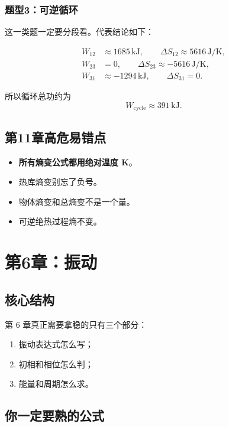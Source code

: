 \documentclass[12pt,a4paper]{article}
\newcommand{\warn}[1]{\textcolor{red!70!black}{\textbf{#1}}}
\begin{document}
\subsubsection*{题型3：可逆循环}

这一类题一定要分段看。代表结论如下：

\begin{align*}
W_{12} &\approx 1685\,\mathrm{kJ},\qquad \Delta S_{12}\approx 5616\,\mathrm{J/K},\\
W_{23} &= 0,\qquad \Delta S_{23}\approx -5616\,\mathrm{J/K},\\
W_{31} &\approx -1294\,\mathrm{kJ},\qquad \Delta S_{31}=0.
\end{align*}

所以循环总功约为
\[
W_{\text{cycle}}\approx 391\,\mathrm{kJ}.
\]

\subsection{第11章高危易错点}

\begin{itemize}
  \item \warn{所有熵变公式都用绝对温度 K}。
  \item 热库熵变别忘了负号。
  \item 物体熵变和总熵变不是一个量。
  \item 可逆绝热过程熵不变。
\end{itemize}

\section{第6章：振动}

\subsection{核心结构}

第 6 章真正需要拿稳的只有三个部分：

\begin{enumerate}
  \item 振动表达式怎么写；
  \item 初相和相位怎么判；
  \item 能量和周期怎么求。
\end{enumerate}

\subsection{你一定要熟的公式}
\end{document}
